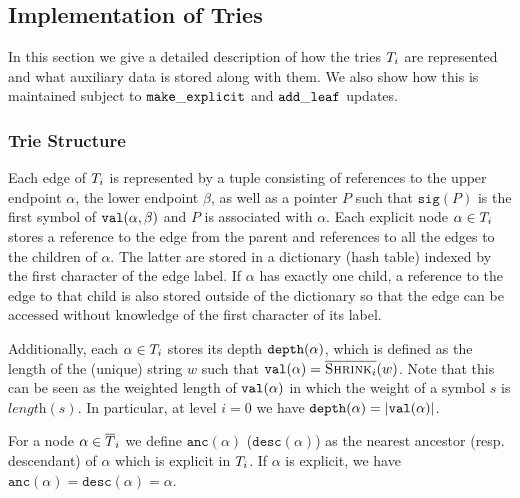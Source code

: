 \documentclass[a4paper]{article}
\theoremstyle{remark}
\newcommand{\cshrink}[1]{\ensuremath{\overline{\textsc{Shrink}_{#1}}}}
\newcommand{\slength}{\textit{length}}
\newcommand{\itsig}{\mathtt{sig}}
\begin{document}
\subsection{Implementation of Tries}\label{sec:trierepr}
In this section we give a detailed description of how the tries $T_i$ are represented
and what auxiliary data is stored along with them.
We also show how this is maintained subject to $\mathtt{make\_explicit}$ and $\mathtt{add\_leaf}$ updates.

\subsubsection{Trie Structure}

Each edge of $T_i$ is represented by a tuple consisting of references to the upper endpoint $\alpha$, the lower endpoint $\beta$,
as well as a pointer $P$ such that $\itsig(P)$ is the first symbol of $\mathtt{val}(\alpha,\beta)$ and $P$ is associated with $\alpha$.
Each explicit node $\alpha\in T_i$ stores a reference to the edge from the parent
and references to all the edges to the children of $\alpha$.
The latter are stored in a dictionary (hash table) indexed by the first character of the edge label.
If $\alpha$ has exactly one child, a reference to the edge to that child is also stored outside of the dictionary
so that the edge can be accessed without knowledge of the first character of its label.

Additionally, each $\alpha\in T_i$ stores its depth $\mathtt{depth}(\alpha)$, which is defined as the length
of the (unique) string $w$ such that $\tval(\alpha)=\cshrink{i}(w)$.
Note that this can be seen as the weighted length of $\mathtt{val}(\alpha)$ in which the weight of a symbol $s$ is $\slength(s)$.
In particular, at level $i=0$ we have $\mathtt{depth}(\alpha)=|\mathtt{val}(\alpha)|$.





\newcommand{\tanc}{\mathtt{anc}}
\newcommand{\tdesc}{\mathtt{desc}}
For a node $\alpha\in\overline{T}_i$ we define $\tanc(\alpha)$ ($\tdesc(\alpha)$) as the nearest ancestor (resp. descendant)
of $\alpha$ which is explicit in $T_i$. If $\alpha$ is explicit, we have $\tanc(\alpha)=\tdesc(\alpha)=\alpha$.
\end{document}
